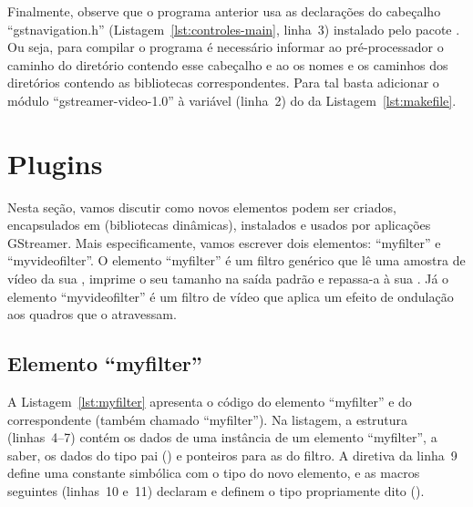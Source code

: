 \documentclass{SBCbookchapter}
\begin{document}


Finalmente, observe que o programa anterior usa as declarações do cabeçalho
``gstnavigation.h'' (Listagem~\ref{lst:controles-main}, linha~3) instalado
pelo pacote .  Ou seja, para compilar o programa é
necessário informar ao pré-processador o caminho do diretório contendo esse
cabeçalho e ao  os nomes e os caminhos dos diretórios contendo as
bibliotecas correspondentes.  Para tal basta adicionar o módulo
``gstreamer-video-1.0'' à variável  (linha~2) do  da
Listagem~\ref{lst:makefile}.


\section{Plugins}
\label{sec:plugins}

Nesta seção, vamos discutir como novos elementos podem ser criados,
encapsulados em  (bibliotecas dinâmicas), instalados e usados
por aplicações GStreamer.  Mais especificamente, vamos escrever dois
elementos: ``myfilter'' e ``myvideofilter''.  O elemento ``myfilter'' é um
filtro genérico que lê uma amostra de vídeo da sua , imprime o
seu tamanho na saída padrão e repassa-a à sua .  Já o
elemento ``myvideofilter'' é um filtro de vídeo que aplica um efeito de
ondulação aos quadros que o atravessam.


\subsection*{Elemento ``myfilter''}

A Listagem~\ref{lst:myfilter} apresenta o código do elemento ``myfilter'' e
do  correspondente (também chamado ``myfilter'').  Na listagem, a
estrutura  (linhas~4--7) contém os dados de uma instância de
um elemento ``myfilter'', a saber, os dados do tipo pai () e
ponteiros para as  do filtro.  A diretiva da linha~9 define uma
constante simbólica com o tipo do novo elemento, e as macros seguintes
(linhas~10 e~11) declaram e definem o tipo propriamente dito
().


\clearpage
\end{document}
